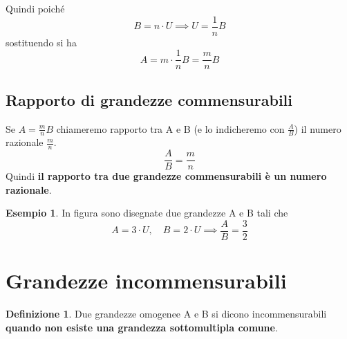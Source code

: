 \documentclass[a4paper,12pt]{article}
\theoremstyle{definition}
\newtheorem{defin}{Definizione}[section]
\newtheorem{esempio}{Esempio}[section]
\theoremstyle{remark}
\begin{document}
Quindi poiché
$$B=n \cdot U \implies U=\frac{1}{n} B$$
sostituendo si ha
$$A=m \cdot \frac{1}{n} B=\frac{m}{n} B$$

\subsection{Rapporto di grandezze commensurabili}

Se $A = \frac{m}{n} B$ chiameremo rapporto tra A e B (e lo indicheremo con $\frac{A}{B}$) il numero razionale $\frac{m}{n}$.
$$\frac{A}{B}=\frac{m}{n}$$
Quindi \textbf{il rapporto tra due grandezze commensurabili è un numero razionale}.

\begin{esempio}
In figura sono disegnate due grandezze A e B tali che
$$A = 3 \cdot U, \quad B = 2 \cdot U \implies \frac{A}{B} = \frac{3}{2}$$

\begin{center}
\end{center}
\end{esempio}

\newpage

\section{Grandezze incommensurabili}

\begin{defin}
Due grandezze omogenee A e B si dicono incommensurabili \textbf{quando non esiste una grandezza sottomultipla comune}.
\end{defin}
\end{document}
